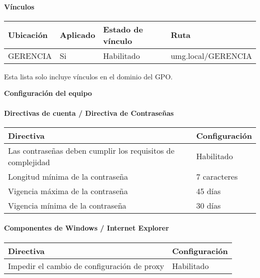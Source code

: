 \documentclass[
]{article}
\begin{document}
\hypertarget{vuxednculos-1}{%
\paragraph{\texorpdfstring{Vínculos }{Vínculos }}\label{vuxednculos-1}}

\begin{longtable}[]{@{}llll@{}}
\toprule
\textbf{Ubicación} & \textbf{Aplicado} & \textbf{Estado de vínculo} &
\textbf{Ruta}\tabularnewline
\midrule
\endhead
GERENCIA & Si & Habilitado & umg.local/GERENCIA\tabularnewline
\bottomrule
\end{longtable}

Esta lista solo incluye vínculos en el dominio del GPO.

\textbf{Configuración del equipo}

\hypertarget{directivas-de-cuenta-directiva-de-contraseuxf1as-1}{%
\paragraph{Directivas de cuenta / Directiva de
Contraseñas}\label{directivas-de-cuenta-directiva-de-contraseuxf1as-1}}

\begin{longtable}[]{@{}ll@{}}
\toprule
\textbf{Directiva} & \textbf{Configuración}\tabularnewline
\midrule
\endhead
Las contraseñas deben cumplir los requisitos de complejidad &
Habilitado\tabularnewline
Longitud mínima de la contraseña & 7 caracteres\tabularnewline
Vigencia máxima de la contraseña & 45 días\tabularnewline
Vigencia mínima de la contraseña & 30 días\tabularnewline
\bottomrule
\end{longtable}

\hypertarget{componentes-de-windows-internet-explorer-1}{%
\paragraph{Componentes de Windows / Internet
Explorer}\label{componentes-de-windows-internet-explorer-1}}

\begin{longtable}[]{@{}ll@{}}
\toprule
\textbf{Directiva} & \textbf{Configuración}\tabularnewline
\midrule
\endhead
Impedir el cambio de configuración de proxy & Habilitado\tabularnewline
\bottomrule
\end{longtable}

\hypertarget{section-11}{%
\subsection{}\label{section-11}}
\end{document}
